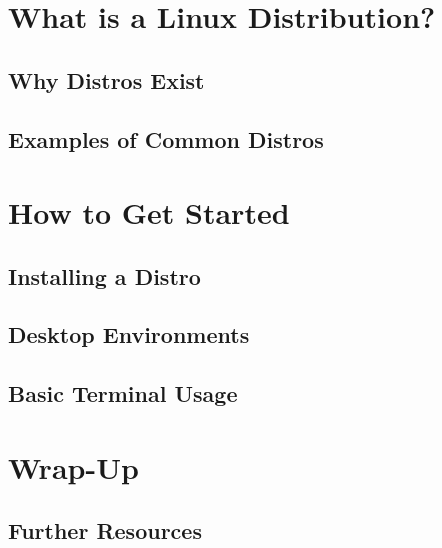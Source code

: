 	\section{What is a Linux Distribution?}
	\subsection{Why Distros Exist}
	\subsection{Examples of Common Distros}
	
	\section{How to Get Started}
	\subsection{Installing a Distro}
	\subsection{Desktop Environments}
	\subsection{Basic Terminal Usage}
	
	\section{Wrap-Up}
	\subsection{Further Resources}
	\lugdocumentend
